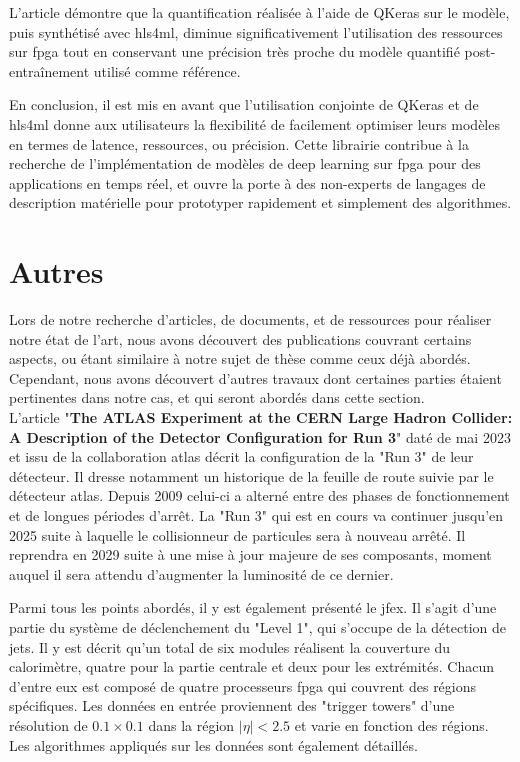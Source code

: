 L'article démontre que la quantification réalisée à l'aide de QKeras sur le modèle, puis synthétisé avec \acrshort{hls4ml}, diminue significativement l'utilisation des ressources sur \acrshort{fpga} tout en conservant une précision très proche du modèle quantifié post-entraînement utilisé comme référence.

En conclusion, il est mis en avant que l'utilisation conjointe de QKeras et de \acrshort{hls4ml} donne aux utilisateurs la flexibilité de facilement optimiser leurs modèles en termes de latence, ressources, ou précision. Cette librairie contribue à la recherche de l'implémentation de modèles de deep learning sur \acrshort{fpga} pour des applications en temps réel, et ouvre la porte à des non-experts de langages de description matérielle pour prototyper rapidement et simplement des algorithmes.


\section{Autres}

Lors de notre recherche d'articles, de documents, et de ressources pour réaliser notre état de l'art, nous avons découvert des publications couvrant certains aspects, ou étant similaire à notre sujet de thèse comme ceux déjà abordés. Cependant, nous avons découvert d'autres travaux dont certaines parties étaient pertinentes dans notre cas, et qui seront abordés dans cette section.\\

L'article "\textbf{The ATLAS Experiment at the CERN Large Hadron Collider: A Description of the Detector Configuration for Run 3}" \cite{aad_atlas_2023} daté de mai 2023 et issu de la collaboration \acrshort{atlas} décrit la configuration de la "Run 3" de leur détecteur. Il dresse notamment un historique de la feuille de route suivie par le détecteur \acrshort{atlas}. Depuis 2009 celui-ci a alterné entre des phases de fonctionnement et de longues périodes d'arrêt. La "Run 3" qui est en cours va continuer jusqu'en 2025 suite à laquelle le collisionneur de particules sera à nouveau arrêté. Il reprendra en 2029 suite à une mise à jour majeure de ses composants, moment auquel il sera attendu d'augmenter la luminosité de ce dernier.

Parmi tous les points abordés, il y est également présenté le \acrfull{jfex}. Il s'agit d'une partie du système de déclenchement du "Level 1", qui s'occupe de la détection de jets. Il y est décrit qu'un total de six modules réalisent la couverture du calorimètre, quatre pour la partie centrale et deux pour les extrémités. Chacun d'entre eux est composé de quatre processeurs \acrshort{fpga} qui couvrent des régions spécifiques. Les données en entrée proviennent des "trigger towers" d'une résolution de $0.1 \times 0.1$ dans la région $|\eta|<2.5$ et varie en fonction des régions. Les algorithmes appliqués sur les données sont également détaillés.

